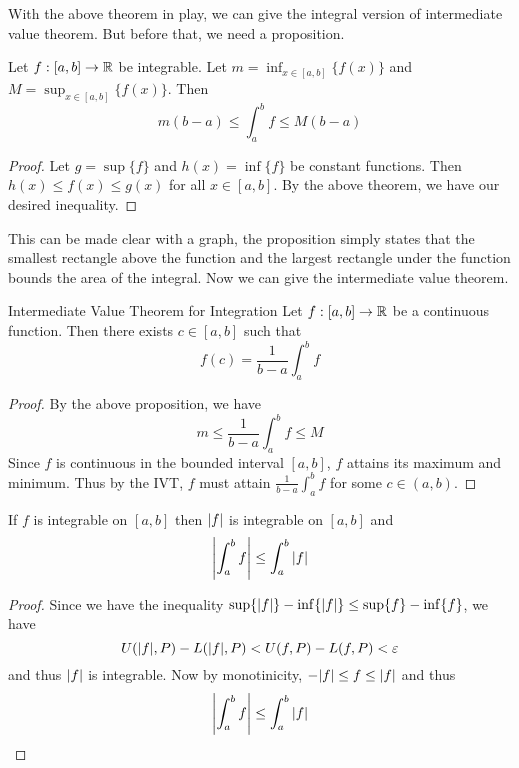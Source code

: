 \documentclass[a4paper]{article}
\begin{document}
With the above theorem in play, we can give the integral version of intermediate value theorem. But before that, we need a proposition. 

\begin{prp}{}{} Let $f:[a,b]\to\mathbb{R}$ be integrable. Let $m=\inf_{x\in[a,b]}\{f(x)\}$ and $M=\sup_{x\in[a,b]}\{f(x)\}$. Then $$m(b-a)\leq\int_{a}^{b}f\leq M(b-a)$$ \tcbline
\begin{proof} Let $g=\sup\{f\}$ and $h(x)=\inf\{f\}$ be constant functions. Then $h(x)\leq f(x)\leq g(x)$ for all $x\in[a,b]$. By the above theorem, we have our desired inequality. 
\end{proof}
\end{prp}

This can be made clear with a graph, the proposition simply states that the smallest rectangle above the function and the largest rectangle under the function bounds the area of the integral. Now we can give the intermediate value theorem. 

\begin{thm}{Intermediate Value Theorem for Integration}{} Let $f:[a,b]\to\mathbb{R}$ be a continuous function. Then there exists $c\in[a,b]$ such that $$f(c)=\frac{1}{b-a}\int_{a}^{b}f$$ \tcbline
\begin{proof} By the above proposition, we have $$m\leq\frac{1}{b-a}\int_a^bf\leq M$$ Since $f$ is continuous in the bounded interval $[a,b]$, $f$ attains its maximum and minimum. Thus by the IVT, $f$ must attain $\frac{1}{b-a}\int_a^bf$ for some $c\in(a,b)$. 
\end{proof}
\end{thm}

\begin{thm}{}{} If $f$ is integrable on $[a,b]$ then $\abs{f}$ is integrable on $[a,b]$ and $$\abs{\int_{a}^{b}f}\leq\int_{a}^{b}\abs{f}$$ \tcbline\begin{proof} Since we have the inequality $\sup\{\abs{f}\}-\inf\{\abs{f}\}\leq\sup\{f\}-\inf\{f\}$, we have $$U(\abs{f},P)-L(\abs{f},P)<U(f,P)-L(f,P)<\varepsilon$$ and thus $\abs{f}$ is integrable. Now by monotinicity, $-\abs{f}\leq f\leq\abs{f}$ and thus $$\abs{\int_a^bf}\leq\int_a^b\abs{f}$$
\end{proof}
\end{thm}
\end{document}
